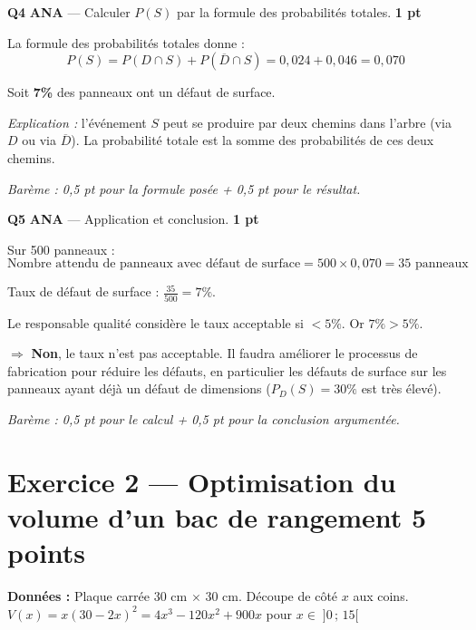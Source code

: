 \documentclass[a4paper,11pt]{article}
\newcommand{\pts}[1]{\hfill\textcolor{gris}{\small\textbf{#1}}}
\newcommand{\comp}[1]{\colorbox{blue!10}{\scriptsize\textbf{#1}}}
\begin{document}
\textbf{Q4} \comp{ANA} — Calculer $P(S)$ par la formule des probabilités totales. \pts{1 pt}

\begin{corrbox}
La formule des probabilités totales donne :
\[
P(S) = P(D \cap S) + P(\overline{D} \cap S) = 0{,}024 + 0{,}046 = \boxed{0{,}070}
\]

Soit \textbf{7\%} des panneaux ont un défaut de surface.

\smallskip
\textit{Explication :} l'événement $S$ peut se produire par deux chemins dans l'arbre (via $D$ ou via $\overline{D}$). La probabilité totale est la somme des probabilités de ces deux chemins.

\smallskip
\textit{Barème : 0,5 pt pour la formule posée + 0,5 pt pour le résultat.}
\end{corrbox}

\textbf{Q5} \comp{ANA} — Application et conclusion. \pts{1 pt}

\begin{corrbox}
Sur 500 panneaux :
\[
\text{Nombre attendu de panneaux avec défaut de surface} = 500 \times 0{,}070 = \boxed{35 \text{ panneaux}}
\]

Taux de défaut de surface : $\frac{35}{500} = 7\%$.

Le responsable qualité considère le taux acceptable si $< 5\%$. Or $7\% > 5\%$.

$\Rightarrow$ \textbf{Non}, le taux n'est pas acceptable. Il faudra améliorer le processus de fabrication pour réduire les défauts, en particulier les défauts de surface sur les panneaux ayant déjà un défaut de dimensions ($P_D(S) = 30\%$ est très élevé).

\smallskip
\textit{Barème : 0,5 pt pour le calcul + 0,5 pt pour la conclusion argumentée.}
\end{corrbox}

\newpage

\section*{Exercice 2 — Optimisation du volume d'un bac de rangement \pts{5 points}}

\begin{contextebox}
\textbf{Données :} Plaque carrée 30 cm $\times$ 30 cm. Découpe de côté $x$ aux coins.\\
$V(x) = x(30-2x)^2 = 4x^3 - 120x^2 + 900x$ pour $x \in \;]0\,;\,15[$
\end{contextebox}
\end{document}
